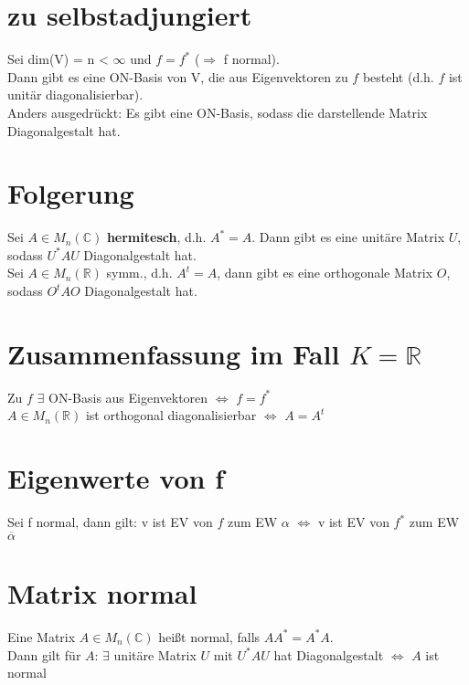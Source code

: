 \section{zu selbstadjungiert}
Sei dim(V) = n < $\infty$ und $f = f^*$ ($\Rightarrow$ f normal).\\
Dann gibt es eine ON-Basis von V, die aus Eigenvektoren zu $f$ besteht (d.h. $f$ ist unitär diagonalisierbar).\\
Anders ausgedrückt: Es gibt eine ON-Basis, sodass die darstellende Matrix Diagonalgestalt hat.

\section{Folgerung}
Sei $A \in M_n(\mathbb{C})$ \textbf{hermitesch}, d.h. $A^*=A$. Dann gibt es eine unitäre Matrix $U$, sodass $U^*AU$ Diagonalgestalt hat.\\
Sei $A \in M_n(\mathbb{R})$ symm., d.h. $A^t=A$, dann gibt es eine orthogonale Matrix $O$, sodass $O^tAO$ Diagonalgestalt hat.\\

\section{Zusammenfassung im Fall $K=\mathbb{R}$}
Zu $f$ $\exists$ ON-Basis aus Eigenvektoren $\Leftrightarrow$ $f = f^*$\\
$A \in M_n(\mathbb{R})$ ist orthogonal diagonalisierbar $\Leftrightarrow$ $A = A^t$\\

\section{Eigenwerte von f}
Sei f normal, dann gilt: v ist EV von $f$  zum EW $\alpha$ $\Leftrightarrow$ v ist EV von $f^*$ zum EW $\overline{\alpha}$

\section{Matrix normal}
Eine Matrix $A \in M_n(\mathbb{C})$ heißt normal, falls $AA^* = A^*A$.\\
Dann gilt für $A$: $\exists$ unitäre Matrix $U$ mit $U^*AU$ hat Diagonalgestalt $\Leftrightarrow$ $A$ ist normal

